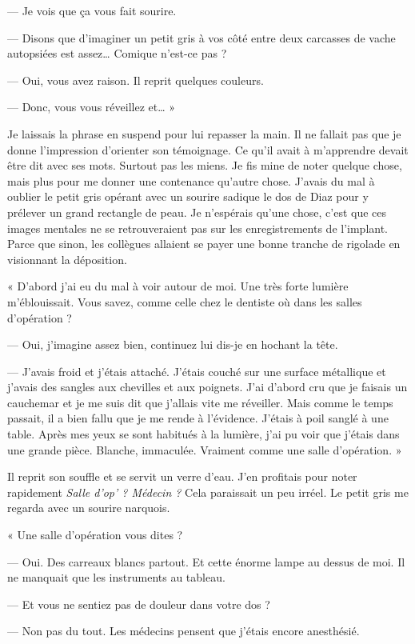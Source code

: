 — Je vois que ça vous fait sourire.

— Disons que d'imaginer un petit gris à vos côté entre deux carcasses de vache autopsiées est assez… Comique n'est-ce
pas ?

— Oui, vous avez raison. Il reprit quelques couleurs.

— Donc, vous vous réveillez et… »

Je laissais la phrase en suspend pour lui repasser la main. Il ne fallait pas que je donne l'impression d'orienter son
témoignage. Ce qu'il avait à m'apprendre devait être dit avec ses mots. Surtout pas les miens. Je fis mine de noter
quelque chose, mais plus pour me donner une contenance qu'autre chose. J'avais du mal à oublier le petit gris opérant 
avec un sourire sadique le dos de Diaz pour y prélever un grand rectangle de peau. Je n'espérais qu'une chose, c'est 
que ces images mentales ne se retrouveraient pas sur les enregistrements de l'implant. Parce que sinon, les collègues 
allaient se payer une bonne tranche de rigolade en visionnant la déposition.

« D'abord j'ai eu du mal à voir autour de moi. Une très forte lumière m'éblouissait. Vous savez, comme celle chez le
dentiste où dans les salles d'opération ?

— Oui, j'imagine assez bien, continuez lui dis-je en hochant la tête.

— J'avais froid et j'étais attaché. J'étais couché sur une surface métallique et j'avais des sangles aux chevilles et
aux poignets. J'ai d'abord cru que je faisais un cauchemar et je me suis dit que j'allais vite me réveiller. Mais comme
le temps passait, il a bien fallu que je me rende à l'évidence. J'étais à poil sanglé à une table. Après mes yeux se
sont habitués à la lumière, j'ai pu voir que j'étais dans une grande pièce. Blanche, immaculée. Vraiment comme une
salle d'opération. »

Il reprit son souffle et se servit un verre d'eau. J'en profitais pour noter rapidement \emph{Salle d'op' ? Médecin ?}
Cela paraissait un peu irréel. Le petit gris me regarda avec un sourire narquois.

« Une salle d'opération vous dites ?

— Oui. Des carreaux blancs partout. Et cette énorme lampe au dessus de moi. Il ne manquait que les instruments au
tableau.

— Et vous ne sentiez pas de douleur dans votre dos ?

— Non pas du tout. Les médecins pensent que j'étais encore anesthésié.

